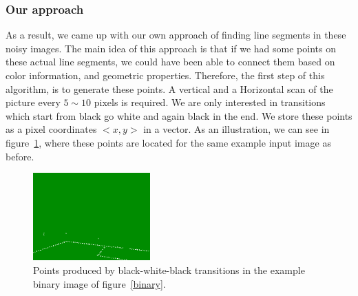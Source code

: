 \documentclass[	DIV=calc,%
							paper=a4,%
							fontsize=9pt,%
							twocolumn]{scrartcl}	 					%
\begin{document}
\subsubsection{Our approach}
As a result, we came up with our own approach of finding line segments in these noisy images. The main idea of this approach is that if we had some points on these actual line segments, we could have been able to connect them based on color information, and geometric properties. Therefore, the first step of this algorithm, is to generate these points. A vertical and a Horizontal scan of the picture every $5 \sim 10$ pixels is required. We are only interested in transitions which start from black go white and again black in the end. We store these points as a pixel coordinates $<x,y>$ in a vector. As an illustration, we can see in figure~\ref{points}, where these points are located for the same example input image as before.
\begin{figure}[t!]
\caption{Points produced by black-white-black transitions in the example binary image of figure~\ref{binary}.}
\label{points}
\centering    
\includegraphics[width=0.4\textwidth]{figures/points.png}
\end{figure}
\end{document}
